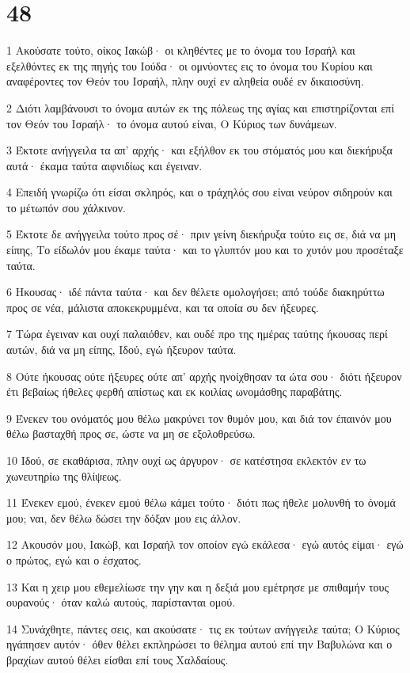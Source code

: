 \chapter{48}

\par 1 Ακούσατε τούτο, οίκος Ιακώβ· οι κληθέντες με το όνομα του Ισραήλ και εξελθόντες εκ της πηγής του Ιούδα· οι ομνύοντες εις το όνομα του Κυρίου και αναφέροντες τον Θεόν του Ισραήλ, πλην ουχί εν αληθεία ουδέ εν δικαιοσύνη.
\par 2 Διότι λαμβάνουσι το όνομα αυτών εκ της πόλεως της αγίας και επιστηρίζονται επί τον Θεόν του Ισραήλ· το όνομα αυτού είναι, Ο Κύριος των δυνάμεων.
\par 3 Έκτοτε ανήγγειλα τα απ' αρχής· και εξήλθον εκ του στόματός μου και διεκήρυξα αυτά· έκαμα ταύτα αιφνιδίως και έγειναν.
\par 4 Επειδή γνωρίζω ότι είσαι σκληρός, και ο τράχηλός σου είναι νεύρον σιδηρούν και το μέτωπόν σου χάλκινον.
\par 5 Έκτοτε δε ανήγγειλα τούτο προς σέ· πριν γείνη διεκήρυξα τούτο εις σε, διά να μη είπης, Το είδωλόν μου έκαμε ταύτα· και το γλυπτόν μου και το χυτόν μου προσέταξε ταύτα.
\par 6 Ηκουσας· ιδέ πάντα ταύτα· και δεν θέλετε ομολογήσει; από τούδε διακηρύττω προς σε νέα, μάλιστα αποκεκρυμμένα, και τα οποία συ δεν ήξευρες.
\par 7 Τώρα έγειναν και ουχί παλαιόθεν, και ουδέ προ της ημέρας ταύτης ήκουσας περί αυτών, διά να μη είπης, Ιδού, εγώ ήξευρον ταύτα.
\par 8 Ούτε ήκουσας ούτε ήξευρες ούτε απ' αρχής ηνοίχθησαν τα ώτα σου· διότι ήξευρον έτι βεβαίως ήθελες φερθή απίστως και εκ κοιλίας ωνομάσθης παραβάτης.
\par 9 Ένεκεν του ονόματός μου θέλω μακρύνει τον θυμόν μου, και διά τον έπαινόν μου θέλω βασταχθή προς σε, ώστε να μη σε εξολοθρεύσω.
\par 10 Ιδού, σε εκαθάρισα, πλην ουχί ως άργυρον· σε κατέστησα εκλεκτόν εν τω χωνευτηρίω της θλίψεως.
\par 11 Ένεκεν εμού, ένεκεν εμού θέλω κάμει τούτο· διότι πως ήθελε μολυνθή το όνομά μου; ναι, δεν θέλω δώσει την δόξαν μου εις άλλον.
\par 12 Ακουσόν μου, Ιακώβ, και Ισραήλ τον οποίον εγώ εκάλεσα· εγώ αυτός είμαι· εγώ ο πρώτος, εγώ και ο έσχατος.
\par 13 Και η χειρ μου εθεμελίωσε την γην και η δεξιά μου εμέτρησε με σπιθαμήν τους ουρανούς· όταν καλώ αυτούς, παρίστανται ομού.
\par 14 Συνάχθητε, πάντες σεις, και ακούσατε· τις εκ τούτων ανήγγειλε ταύτα; Ο Κύριος ηγάπησεν αυτόν· όθεν θέλει εκπληρώσει το θέλημα αυτού επί την Βαβυλώνα και ο βραχίων αυτού θέλει είσθαι επί τους Χαλδαίους.
